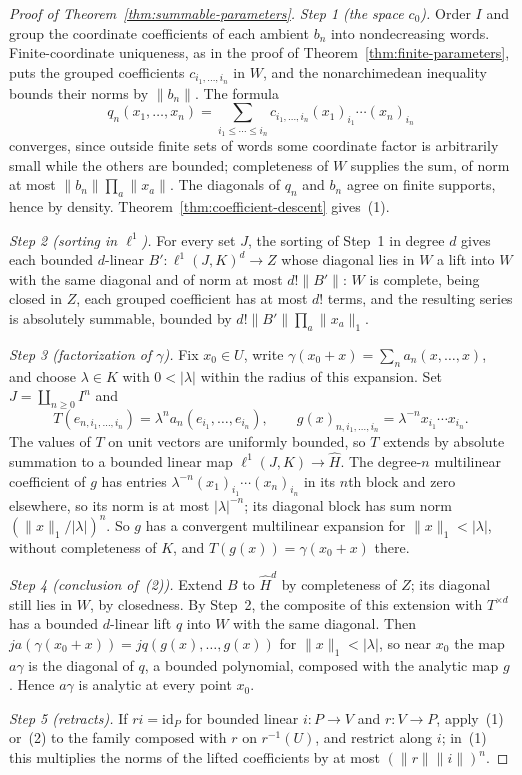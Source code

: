 \documentclass[11pt]{amsart}
\theoremstyle{definition}
\theoremstyle{remark}
\numberwithin{equation}{section}
\newcommand{\id}{\mathrm{id}}
\newcommand{\abs}[1]{\lvert #1\rvert}
\newcommand{\norm}[1]{\lVert #1\rVert}
\theoremstyle{plain}
\theoremstyle{definition}
\theoremstyle{plain}
\begin{document}
\begin{proof}[Proof of Theorem~\ref{thm:summable-parameters}]
\emph{Step 1 (the space $c_0$).} Order $I$ and group the coordinate coefficients of each ambient $b_n$ into
nondecreasing words. Finite-coordinate uniqueness, as in the proof of Theorem~\ref{thm:finite-parameters}, puts the
grouped coefficients $c_{i_1,\ldots,i_n}$ in $W$, and the nonarchimedean inequality bounds their norms by $\norm{b_n}$.
The formula
\[
 q_n(x_1,\ldots,x_n)
 =\sum_{i_1\le\cdots\le i_n}
 c_{i_1,\ldots,i_n}(x_1)_{i_1}\cdots(x_n)_{i_n}
\]
converges, since outside finite sets of words some coordinate factor is arbitrarily small while the others are bounded;
completeness of $W$ supplies the sum, of norm at most $\norm{b_n}\prod_a\norm{x_a}$. The diagonals of $q_n$ and $b_n$
agree on finite supports, hence by density. Theorem~\ref{thm:coefficient-descent} gives~(1).

\emph{Step 2 (sorting in $\ell^1$).} For every set $J$, the sorting of Step~1 in degree $d$ gives each bounded
$d$-linear $B'\colon\ell^1(J,K)^d\to Z$ whose diagonal lies in $W$ a lift into $W$ with the same diagonal and of norm at
most $d!\norm{B'}$: $W$ is complete, being closed in $Z$, each grouped coefficient has at most $d!$ terms, and the
resulting series is absolutely summable, bounded by $d!\norm{B'}\prod_a\norm{x_a}_1$.

\emph{Step 3 (factorization of $\gamma$).} Fix $x_0\in U$, write $\gamma(x_0+x)=\sum_na_n(x,\ldots,x)$, and choose
$\lambda\in K$ with $0<\abs\lambda$ within the radius of this expansion. Set $J=\coprod_{n\ge0}I^n$ and
\[
 T(e_{n,i_1,\ldots,i_n})=\lambda^na_n(e_{i_1},\ldots,e_{i_n}),
 \qquad
 g(x)_{n,i_1,\ldots,i_n}=\lambda^{-n}x_{i_1}\cdots x_{i_n}.
\]
The values of $T$ on unit vectors are uniformly bounded, so $T$ extends by absolute summation to a bounded linear map
$\ell^1(J,K)\to\widehat H$. The degree-$n$ multilinear coefficient of $g$ has entries
$\lambda^{-n}(x_1)_{i_1}\cdots(x_n)_{i_n}$ in its $n$th block and zero elsewhere, so its norm is at most
$\abs\lambda^{-n}$; its diagonal block has sum norm $(\norm{x}_1/\abs\lambda)^n$. So $g$ has a convergent multilinear
expansion for $\norm{x}_1<\abs\lambda$, without completeness of $K$, and $T(g(x))=\gamma(x_0+x)$ there.

\emph{Step 4 (conclusion of~(2)).} Extend $B$ to $\widehat H^d$ by completeness of $Z$; its diagonal still lies in $W$,
by closedness. By Step~2, the composite of this extension with $T^{\times d}$ has a bounded $d$-linear lift $q$ into $W$
with the same diagonal. Then $ja(\gamma(x_0+x))=jq(g(x),\ldots,g(x))$ for $\norm{x}_1<\abs\lambda$, so near $x_0$ the
map $a\gamma$ is the diagonal of $q$, a bounded polynomial, composed with the analytic map $g$. Hence $a\gamma$ is
analytic at every point $x_0$.

\emph{Step 5 (retracts).} If $ri=\id_P$ for bounded linear $i\colon P\to V$ and $r\colon V\to P$, apply~(1) or~(2) to
the family composed with $r$ on $r^{-1}(U)$, and restrict along $i$; in~(1) this multiplies the norms of the lifted
coefficients by at most $(\norm r\norm i)^n$.
\end{proof}
\end{document}
